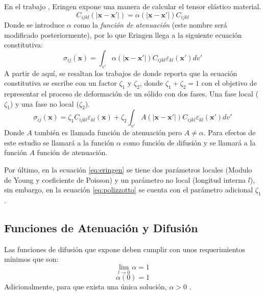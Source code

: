 En el trabajo , Eringen expone una manera de calcular el tensor elástico material.
\begin{equation}
	C_{ijkl}(|\boldsymbol{x}-\boldsymbol{x'}|)=\alpha(|\boldsymbol{x}-\boldsymbol{x'}|)C_{ijkl}
\end{equation}
Donde se introduce $\alpha$ como la \textit{función de atenuación} (este nombre será modificado posteriormente), por lo que Eringen llega a la siguiente ecuación constitutiva:
\begin{equation}
	\sigma_{ij}(\boldsymbol{x})=\int_{v'}\alpha(|\boldsymbol{x}-\boldsymbol{x'}|)C_{ijkl}\varepsilon_{kl}(\boldsymbol{x'})dv'
	\label{eq:eringen}
\end{equation}
A partir de aquí, se resaltan los trabajos de \textcite{Polizzotto2001} donde reporta que la ecuación constitutiva se escribe con un factor $\zeta_1$ y $\zeta_2$, donde $\zeta_1+\zeta_2=1$ con el objetivo de representar el proceso de deformación de un sólido con dos fases. Una fase local ($\zeta_1$) y una fase no local ($\zeta_2$).
\begin{equation}
	\sigma_{ij}(\boldsymbol{x})=\zeta_1C_{ijkl}\varepsilon_{kl}(\boldsymbol{x})+\zeta_2\int_{v'}A(|\boldsymbol{x}-\boldsymbol{x'}|)C_{ijkl}\varepsilon_{kl}(\boldsymbol{x'})dv'
	\label{eq:polizzotto}
\end{equation}
Donde $A$ también es llamada función de atenuación pero $A\neq\alpha$.
Para efectos de este estudio se llamará a la función $\alpha$ como función de difusión y se llamará a la función $A$ función de atenuación.

Por último, en la ecuación \ref{eq:eringen} se tiene dos parámetros locales (Modulo de Young y coeficiente de Poisson) y un parámetro no local (longitud interna $l$), sin embargo, en la ecuación \ref{eq:polizzotto} se cuenta con el parámetro adicional $\zeta_1$.
\subsection{Funciones de Atenuación y Difusión}

Las funciones de difusión que expone \textcite{Eringen1987} deben cumplir con unos requerimientos mínimos que son:
\begin{equation}
	\lim_{l\to0}\alpha=1
\end{equation}
\begin{equation}
	\alpha(0)=1
\end{equation}
Adicionalmente, para que exista una única solución, $\alpha>0$ \parencite{ALTAN19891271}.

